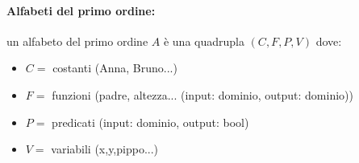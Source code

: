 \documentclass[a4paper,12pt]{article}
\begin{document}
\paragraph{Alfabeti del primo ordine:} un alfabeto del primo ordine $A$ è una quadrupla $(C,F,P,V)$ dove:
\begin{itemize}
    \item $C = $ costanti (Anna, Bruno...)
    \item $F = $ funzioni (padre, altezza... (input: dominio, output: dominio))
    \item $P = $ predicati (input: dominio, output: bool)
    \item $V = $ variabili (x,y,pippo...)
\end{itemize}
\end{document}
